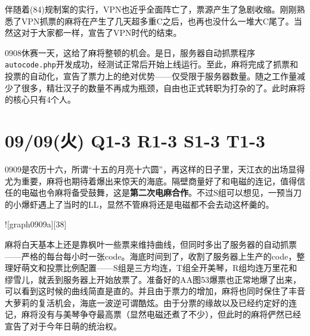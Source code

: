 伴随着(84)规制案的实行，VPN也近乎全面阵亡了，票源产生了急剧收缩。刚刚熟悉了VPN抓票的麻将在产生了几天超多重C之后，也再也没什么一堆大C尾了。当然这对于大家都一样，宣告了VPN时代的结束。

0908休赛一天，这给了麻将整顿的机会。是日，服务器自动抓票程序\verb=autocode.php=开发成功，经测试正常后开始上线运行。至此，麻将完成了抓票和投票的自动化，宣告了票力上的绝对优势——仅受限于服务器数量。随之工作量减少了很多，精壮汉子的数量不再成为瓶颈，自由也正式转职为打杂的了。此时麻将的核心只有4个人。

\section{09/09(火) Q1-3 R1-3 S1-3 T1-3}


0909是农历十六，所谓“十五的月亮十六圆”，再这样的日子里，天江衣的出场显得尤为重要，麻将也期待着爆出来惊天的海底。隔壁商量好了和电磁的连记，值得信任的电磁也令麻将备受鼓舞，这是\textbf{第二次电麻合作}。不过S组可以想见，一预当刀的小爆虾遇上了当时的LL，显然不管麻将还是电磁都不会去动这杯羹的。

![graph0909a][38]

麻将白天基本上还是靠枫叶一些票来维持曲线，但同时多出了服务器的自动抓票——严格的每台每小时一张code。海底时间到了，收割了服务器上生产的code，整理好萌文和投票比例配置——S组是三方均连，T组全开美琴，R组均连万里花和缪雪儿，就丢到服务器上开始放票了。准备好的AA图53爆票也正常地爆了出来，可以看到这时候的曲线简直是直的。并且由于票力的增加，麻将也同时保住了丰音大萝莉的复活机会，海底一波逆可谓酷炫。由于分票的缘故以及已经约定好的连记，麻将没有与美琴争夺最高票（显然电磁还煮了不少），但此时的麻将俨然已经宣告了对于今年日萌的统治权。

